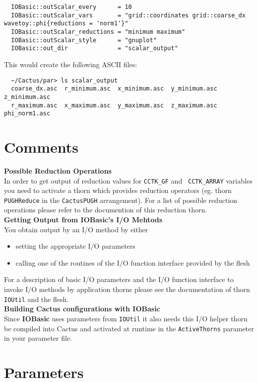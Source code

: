\documentclass{article}
\begin{document}
\begin{verbatim}
  IOBasic::outScalar_every      = 10
  IOBasic::outScalar_vars       = "grid::coordinates grid::coarse_dx wavetoy::phi{reductions = 'norm1'}"
  IOBasic::outScalar_reductions = "minimum maximum"
  IOBasic::outScalar_style      = "gnuplot"
  IOBasic::out_dir              = "scalar_output"
\end{verbatim}
This would create the following ASCII files:
\begin{verbatim}
  ~/Cactus/par> ls scalar_output
  coarse_dx.asc  r_minimum.asc  x_minimum.asc  y_minimum.asc  z_minimum.asc
  r_maximum.asc  x_maximum.asc  y_maximum.asc  z_maximum.asc  phi_norm1.asc
\end{verbatim}
%
%
\section{Comments}
%
{\bf Possible Reduction Operations}\\
%
In order to get output of reduction values for {\tt CCTK\_GF} and {\tt
CCTK\_ARRAY} variables you need to activate a thorn which provides
reduction operators (eg. thorn {\tt PUGHReduce} in the {\tt CactusPUGH}
arrangement). For a list of possible reduction operations please refer to
the documention of this reduction thorn.\\[3ex]
%
{\bf Getting Output from {\bf IOBasic}'s I/O Mehtods}\\
%
You obtain output by an I/O method by either
%
\begin{itemize}
  \item setting the appropriate I/O parameters
  \item calling one of the routines of the I/O function interface
        provided by the flesh
\end{itemize}
%
For a description of basic I/O parameters and the I/O function interface to
invoke I/O methods by application thorns please see the documentation of thorn
{\tt IOUtil} and the flesh.\\[3ex]
%
%
{\bf Building Cactus configurations with {\bf IOBasic}}\\
%
Since {\bf IOBasic} uses parameters from {\tt IOUtil} it also needs this I/O
helper thorn be compiled into Cactus and activated at runtime in the
{\tt ActiveThorns} parameter in your parameter file.




\section{Parameters} 
\end{document}
